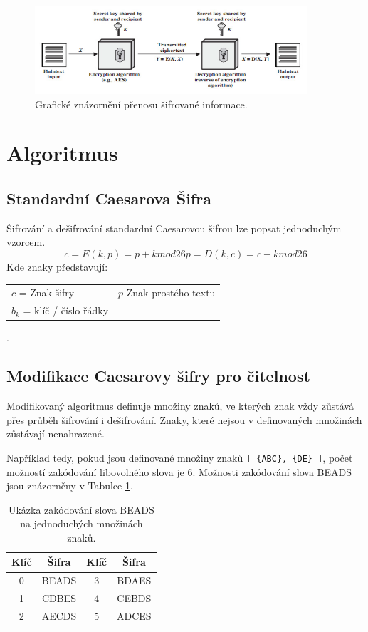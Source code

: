 \documentclass[12pt,a4paper]{article}
\let\oldsection\section
\renewcommand\section{\clearpage\oldsection}
\begin{document}
\begin{figure}[h]
\center
\includegraphics[width=0.9\textwidth]{img/ciphertextTransfer.png}
\caption{Grafické znázornění přenosu šifrované informace.}
\label{img:ciphertextTransfer}
\end{figure}

\section{Algoritmus}
\subsection{Standardní Caesarova Šifra}
Šifrování a dešifrování standardní Caesarovou šifrou lze popsat jednoduchým vzorcem.
\begin{equation}
c = E(k, p) = p + k mod26
p = D(k, c) = c - k mod26
\end{equation}
Kde znaky představují:
\begin{tabular}{ll}
$c$ = Znak šifry & $p$ Znak prostého textu \\
$b_k$ = klíč / číslo řádky 
\end{tabular} \cite{kiwi16}. \\
\subsection{Modifikace Caesarovy šifry pro čitelnost}
Modifikovaný algoritmus definuje množiny znaků, ve kterých znak vždy zůstává přes průběh šifrování i dešifrování. Znaky, které nejsou v definovaných množinách zůstávají nenahrazené.

Například tedy, pokud jsou definované množiny znaků \texttt{[ \{ABC\}, \{DE\} ]}, počet možností zakódování libovolného slova je 6\cite{kiwi16}. Možnosti zakódování slova BEADS jsou znázorněny v Tabulce \ref{tab:beads}.\\
\begin{table}[h]
\caption{Ukázka zakódování slova BEADS na jednoduchých množinách znaků.}
\label{tab:beads}
\center
\begin{tabular}{|c|c||c|c|}
\hline
\textbf{Klíč} & \textbf{Šifra} & \textbf{Klíč} & \textbf{Šifra}\\ \hline
0 & BEADS & 3 & BDAES \\ \hline
1 & CDBES & 4 & CEBDS \\ \hline
2 & AECDS & 5 & ADCES \\ \hline
\end{tabular}
\end{table}
\end{document}
